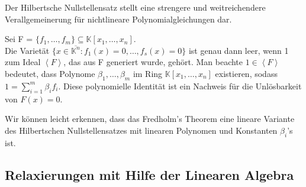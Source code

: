 \noindent Der Hilbertsche Nullstellensatz stellt eine strengere und weitreichendere Verallgemeinerung für nichtlineare Polynomialgleichungen dar.

\begin{theorem} 
Sei F = $\{f_1,\ldots,f_m\} \subseteq \mathbb{K}[x_1,\ldots,x_n]$.\\
Die Varietät $\{x \in \overline{\mathbb{K}^n} : f_1(x)=0,\ldots,f_s(x)=0\}$ ist genau dann leer, wenn 1 zum Ideal $\left\langle F \right\rangle$, das aus F generiert wurde, gehört. Man beachte $1 \in \left\langle F \right\rangle$ bedeutet, dass Polynome $\beta_1,\ldots,\beta_m$ im Ring $\mathbb{K}[x_1,\ldots,x_n]$ existieren, sodass $1 = \sum_{i=1}^m \beta_i f_i$. Diese polynomielle Identität ist ein Nachweis für die Unlösbarkeit von $F(x) = 0$. 
\end{theorem}

\noindent Wir können leicht erkennen, dass das Fredholm's Theorem eine lineare Variante des Hilbertschen Nullstellensatzes mit linearen Polynomen und Konstanten $\beta_i$'s ist. 

\subsection{Relaxierungen mit Hilfe der Linearen Algebra}


